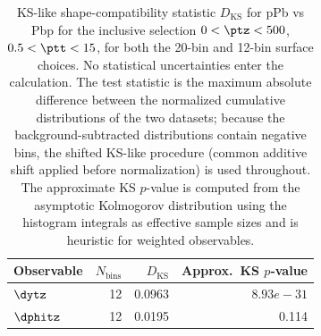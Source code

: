 \begin{table}[hbtp]
\centering
\begin{tabular}{|l|r|r|r|}
\hline
Observable & $N_{\mathrm{bins}}$ & $D_{\mathrm{KS}}$ & Approx.\ KS $p$-value \\
\hline
$\dytz$ & 12 & 0.0963 & $8.93e-31$ \\
$\dphitz$ & 12 & 0.0195 & 0.114 \\
\hline
\end{tabular}
\caption{KS-like shape-compatibility statistic $D_{\mathrm{KS}}$ for pPb vs Pbp for the inclusive selection $0 < \ptz < 500$\GeV, $0.5 < \ptt < 15$\GeV, for both the 20-bin and 12-bin surface choices. No statistical uncertainties enter the calculation. The test statistic is the maximum absolute difference between the normalized cumulative distributions of the two datasets; because the background-subtracted distributions contain negative bins, the shifted KS-like procedure (common additive shift applied before normalization) is used throughout. The approximate KS $p$-value is computed from the asymptotic Kolmogorov distribution using the histogram integrals as effective sample sizes and is heuristic for weighted observables.}
\label{table:combining_ks}
\end{table}
